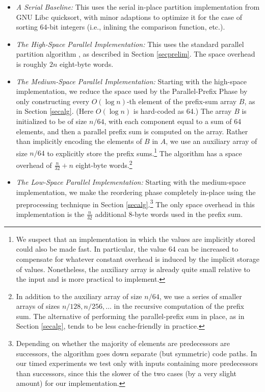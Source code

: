 \documentclass[sigconf]{acmart}
\theoremstyle{remark}
\theoremstyle{remark}
\begin{document}
\begin{itemize}[leftmargin = .15in]
\item \emph{A Serial Baseline:} This uses the serial in-place
  partition implementation from GNU Libc quicksort, with minor
  adaptions to optimize it for the case of sorting 64-bit integers
  (i.e., inlining the comparison function, etc.).
\item \emph{The High-Space Parallel Implementation:} This uses the
  standard parallel partition algorithm \cite{Blelloch96,AcarBl16}, as
  described in Section \ref{secprelim}. The space overhead is roughly
  $2n$ eight-byte words.
\item \emph{The Medium-Space Parallel Implementation:} Starting with
  the high-space implementation, we reduce the space used by the
  Parallel-Prefix Phase by only constructing every $O(\log n)$-th
  element of the prefix-sum array $B$, as in Section
  \ref{secalg}. (Here $O(\log n)$ is hard-coded as 64.) The array $B$
  is initialized to be of size $n / 64$, with each component equal to
  a sum of 64 elements, and then a parallel prefix sum is computed on
  the array. Rather than implicitly encoding the elements of $B$ in
  $A$, we use an auxiliary array of size $n / 64$ to explicitly store
  the prefix sums.\footnote{We suspect that an implementation in which
    the values are implicitly stored could also be made fast. In
    particular, the value 64 can be increased to compensate for
    whatever constant overhead is induced by the implicit storage of
    values. Nonetheless, the auxiliary array is already quite small
    relative to the input and is more practical to implement.} The algorithm
  has a space overhead of $\frac{n}{32} + n$ eight-byte
  words.\footnote{In addition to the auxiliary array of size $n / 64$,
    we use a series of smaller arrays of sizes $n / 128, n / 256,
    \ldots$ in the recursive computation of the prefix sum. The
    alternative of performing the parallel-prefix sum in place, as in
    Section \ref{secalg}, tends to be less cache-friendly in
    practice.}
\item \emph{The Low-Space Parallel Implementation:}
Starting with the medium-space implementation, we make the reordering
phase completely in-place using the preprocessing technique in Section
\ref{secalg}.\footnote{Depending on whether the majority of elements
  are predecessors are successors, the algorithm goes down separate
  (but symmetric) code paths. In our timed experiments we test only
  with inputs containing more predecessors than successors, since this
  the slower of the two cases (by a very slight amount) for our
  implementation.} The only space overhead in this implementation is
the $\frac{n}{32}$ additional 8-byte words used in the prefix sum.
\end{itemize}
\end{document}
